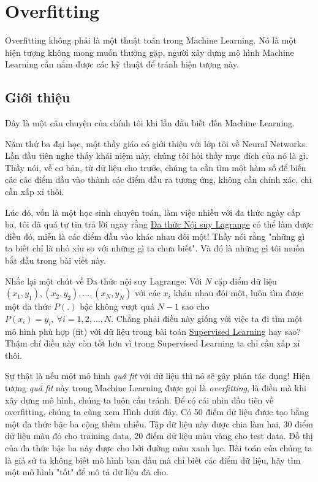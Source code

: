 \chapter{Overfitting}

 
 
Overfitting không phải là một thuật toán trong Machine Learning. Nó là một hiện tượng không mong muốn thường gặp, người xây dựng mô hình Machine Learning cần nắm được các kỹ thuật để tránh hiện tượng này. 
 
 
\section{Giới thiệu}
Đây là một câu chuyện của chính tôi khi lần đầu biết đến Machine Learning. 
 
Năm thứ ba đại học, một thầy giáo có giới thiệu với lớp tôi về Neural Networks. Lần đầu tiên nghe thấy khái niệm này, chúng tôi hỏi thầy mục đích của nó là gì. Thầy nói, về cơ bản, từ dữ liệu cho trước, chúng ta cần tìm một hàm số để biến các các điểm đầu vào thành các điểm đầu ra tương ứng, không cần chính xác, chỉ cần xấp xỉ thôi. 
 
Lúc đó, vốn là một học sinh chuyên toán, làm việc nhiều với đa thức ngày cấp ba, tôi đã quá tự tin trả lời ngay rằng \href{http://vuontoanblog.blogspot.com/2012/10/polynomial-interpolation-lagrange.html}{Đa thức Nội suy Lagrange} có thể làm được điều đó, miễn là các điểm đầu vào khác nhau đôi một! Thầy nói rằng "những gì ta biết chỉ là nhỏ xíu so với những gì ta chưa biết". Và đó là những gì tôi muốn bắt đầu trong bài viết này. 
 
Nhắc lại một chút về Đa thức nội suy Lagrange: Với $N$ cặp điểm dữ liệu $(x_1, y_1), (x_2, y_2), \dots, (x_N, y_N)$ với các $x_i$ kháu nhau đôi một, luôn tìm được một đa thức $P(.)$ bậc không vượt quá $N-1$ sao cho $P(x_i) = y_i, ~\forall i = 1, 2, \dots, N$. Chẳng phải điều này giống với việc ta đi tìm một mô hình phù hợp (fit) với dữ liệu trong bài toán \href{http://machinelearningcoban.com/2016/12/27/categories/#supervised-learning-hoc-co-giam-sat}{Supervised Learning} hay sao? Thậm chí điều này còn tốt hơn vì trong Supervised Learning ta chỉ cần xấp xỉ thôi. 
 
Sự thật là nếu một mô hình \textit{quá fit} với dữ liệu thì nó sẽ gây phản tác dụng! Hiện tượng \textit{quá fit} này trong Machine Learning được gọi là \textit{overfitting}, là điều mà khi xây dựng mô hình, chúng ta luôn cần tránh. Để có cái nhìn đầu tiên về overfitting, chúng ta cùng xem Hình dưới đây. Có 50 điểm dữ liệu được tạo bằng một đa thức bậc ba cộng thêm nhiễu. Tập dữ liệu này được chia làm hai, 30 điểm dữ liệu màu đỏ cho training data, 20 điểm dữ liệu màu vàng cho test data. Đồ thị của đa thức bậc ba này được cho bởi đường màu xanh lục. Bài toán của chúng ta là giả sử ta không biết mô hình ban đầu mà chỉ biết các điểm dữ liệu, hãy tìm một mô hình "tốt" để mô tả dữ liệu đã cho. 
 

